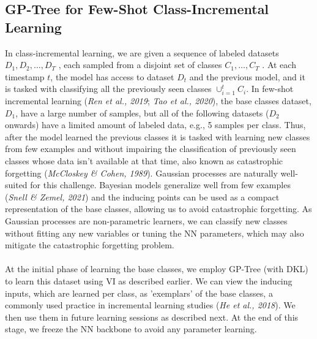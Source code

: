 \documentclass[preprint,11pt]{elsarticle}
\begin{document}
    \subsection{GP-Tree for Few-Shot Class-Incremental Learning}
    \label{sec:3.4}
        In class-incremental learning, we are given a sequence of
        labeled datasets $D_1,D_2,\ldots,D_T$ , each sampled from a disjoint
        set of classes $C_1,\ldots,C_T$ . At each timestamp $t$, the
        model has access to dataset $D_t$ and the previous model, and
        it is tasked with classifying all the previously seen classes
        $\cup_{i=1}^t
        C_i$. In few-shot incremental learning (\textit{Ren et al., 2019}\cite{ren2019incremental};
        \textit{Tao et al., 2020}\cite{tao2020few}), the base classes dataset, $D_1$, have a large
        number of samples, but all of the following datasets ($D_2$ onwards)
        have a limited amount of labeled data, e.g., 5 samples
        per class. Thus, after the model learned the previous classes
        it is tasked with learning new classes from few examples
        and without impairing the classification of previously seen
        classes whose data isn’t available at that time, also known as
        catastrophic forgetting (\textit{McCloskey \& Cohen, 1989}\cite{mccloskey1989catastrophic}). Gaussian
        processes are naturally well-suited for this challenge.
        Bayesian models generalize well from few examples (\textit{Snell
        \& Zemel, 2021}\cite{snell2021bayesian}) and the inducing points can be used as
        a compact representation of the base classes, allowing us
        to avoid catastrophic forgetting. As Gaussian processes
        are non-parametric learners, we can classify new classes
        without fitting any new variables or tuning the NN parameters,
        which may also mitigate the catastrophic forgetting
        problem.
        \\
        \\
        At the initial phase of learning the base classes, we employ
        GP-Tree (with DKL) to learn this dataset using VI as described
        earlier. We can view the inducing inputs, which
        are learned per class, as ’exemplars’ of the base classes, a
        commonly used practice in incremental learning studies (\textit{He
        et al., 2018}\cite{he2018exemplar}). We then use them in future learning sessions
        as described next. At the end of this stage, we freeze the
        NN backbone to avoid any parameter learning.
        \\
\end{document}
